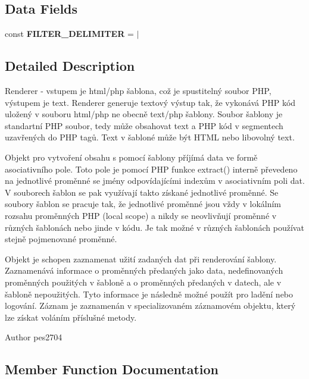 \subsection*{Data Fields}
\begin{DoxyCompactItemize}
\item 
\mbox{\label{class_pes_1_1_view_1_1_renderer_1_1_php_renderer_a829835c5b177092fee5ecb9a2cd14290}} 
const {\bfseries F\+I\+L\+T\+E\+R\+\_\+\+D\+E\+L\+I\+M\+I\+T\+ER} = \textquotesingle{}$\vert$\textquotesingle{}
\end{DoxyCompactItemize}


\subsection{Detailed Description}
Renderer -\/ vstupem je html/php šablona, což je spustitelný soubor P\+HP, výstupem je text. Renderer generuje textový výstup tak, že vykonává P\+HP kód uložený v souboru html/php ne obecně text/php šablony. Soubor šablony je standartní P\+HP soubor, tedy může obsahovat text a P\+HP kód v segmentech uzavřených do P\+HP tagů. Text v šabloné může být H\+T\+ML nebo libovolný text.

Objekt pro vytvoření obsahu s pomocí šablony příjímá data ve formě asociativního pole. Toto pole je pomocí P\+HP funkce extract() interně převedeno na jednotlivé proměnné se jmény odpovídajícími indexům v asociativním poli dat. V souborech šablon se pak využívají takto získané jednotlivé proměnné. Se soubory šablon se pracuje tak, že jednotlivé proměnné jsou vždy v lokálním rozsahu proměnných P\+HP (local scope) a nikdy se neovlivňují proměnné v různých šablonách nebo jinde v kódu. Je tak možné v různých šablonách používat stejně pojmenované proměnné.

Objekt je schopen zaznamenat užití zadaných dat při renderování šablony. Zaznamenává informace o proměnných předaných jako data, nedefinovaných proměnných použitých v šabloně a o proměnných předaných v datech, ale v šabloně nepoužitých. Tyto informace je následně možné použít pro ladění nebo logování. Záznam je zaznamenán v specializovaném záznamovém objektu, který lze získat voláním příslušné metody.

\begin{DoxyAuthor}{Author}
pes2704 
\end{DoxyAuthor}


\subsection{Member Function Documentation}
\mbox{\label{class_pes_1_1_view_1_1_renderer_1_1_php_renderer_ae62d97adedce8c34fa312e0f63b1df26}} 
